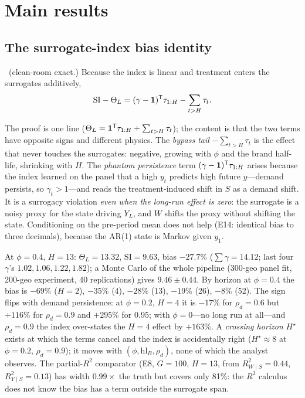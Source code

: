 \section{Main results}

\subsection{The surrogate-index bias identity}

\begin{theorem}
\label{surr:thm:si}
\tagEstablished\ (clean-room exact.) Because the index is linear and treatment enters the surrogates additively,
\begin{equation}
\mathrm{SI} - \Theta_L = (\gamma - \mathbf{1})^{\mathsf{T}}\tau_{1:H} - \sum_{t > H}\tau_t .
\label{eq:surr:si}
\end{equation}
\end{theorem}

The proof is one line ($\Theta_L = \mathbf{1}^{\mathsf{T}}\tau_{1:H} + \sum_{t > H}\tau_t$); the content is that the two terms have opposite signs and different physics. The \emph{bypass tail} $-\sum_{t > H}\tau_t$ is the effect that never touches the surrogates: negative, growing with $\phi$ and the brand half-life, shrinking with $H$. The \emph{phantom persistence} term $(\gamma - \mathbf{1})^{\mathsf{T}}\tau_{1:H}$ arises because the index learned on the panel that a high $y_t$ predicts high future $y$---demand persists, so $\gamma_t > 1$---and reads the treatment-induced shift in $S$ as a demand shift. It is a surrogacy violation \emph{even when the long-run effect is zero}: the surrogate is a noisy proxy for the state driving $Y_L$, and $W$ shifts the proxy without shifting the state. Conditioning on the pre-period mean does not help (E14: identical bias to three decimals), because the AR(1) state is Markov given $y_1$.

At $\phi = 0.4$, $H = 13$: $\Theta_L = 13.32$, $\mathrm{SI} = 9.63$, bias $-27.7\%$ ($\sum\gamma = 14.12$; last four $\gamma$'s $1.02, 1.06, 1.22, 1.82$); a Monte Carlo of the whole pipeline (300-geo panel fit, 200-geo experiment, 40 replications) gives $9.46 \pm 0.44$. By horizon at $\phi = 0.4$ the bias is $-69\%$ ($H = 2$), $-35\%$ (4), $-28\%$ (13), $-19\%$ (26), $-8\%$ (52). The sign flips with demand persistence: at $\phi = 0.2$, $H = 4$ it is $-17\%$ for $\rho_d = 0.6$ but $+116\%$ for $\rho_d = 0.9$ and $+295\%$ for $0.95$; with $\phi = 0$---no long run at all---and $\rho_d = 0.9$ the index over-states the $H = 4$ effect by $+163\%$. A \emph{crossing horizon} $H^\star$ exists at which the terms cancel and the index is accidentally right ($H^\star \approx 8$ at $\phi = 0.2$, $\rho_d = 0.9$); it moves with $(\phi, \mathrm{hl}_B, \rho_d)$, none of which the analyst observes. The partial-$R^2$ comparator (E8, $G = 100$, $H = 13$, from $R^2_{W \mid S} = 0.44$, $R^2_{Y \mid S} = 0.13$) has width $0.99\times$ the truth but covers only 81\%: the $R^2$ calculus does not know the bias has a term outside the surrogate span.

